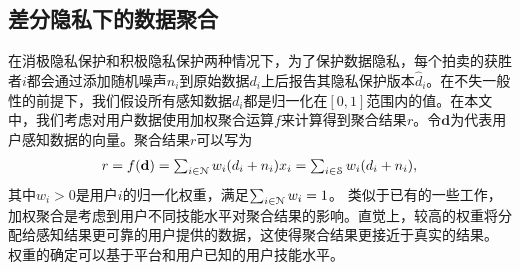 	\subsection{差分隐私下的数据聚合}\label{sec:dp}
	\vspace{-0.1cm}
	在消极隐私保护和积极隐私保护两种情况下，为了保护数据隐私，每个拍卖的获胜者$i$都会通过添加随机噪声$n_i$到原始数据$d_i$上后报告其隐私保护版本$\hat{d}_i$。在不失一般性的前提下，我们假设所有感知数据$d_i$都是归一化在$[0,1]$范围内的值。在本文中，我们考虑对用户数据使用加权聚合运算$f$来计算得到聚合结果$r$。令$\mathbf{d}$为代表用户感知数据的向量。聚合结果$r$可以写为
	\begin{equation}\label{f}
	\begin{array}
	[c]{lll}%
	r=f(\mathbf{d})=\sum_{i\in\mathcal{N}} w_i(d_i+n_i)x_i=\sum_{i\in\mathcal{S}} w_i(d_i+n_i),
	\end{array}
	\end{equation}
	其中$w_i>0$是用户$i$的归一化权重，满足$\sum_{i\in\mathcal{N}}w_i=1$。
	类似于已有的一些工作\cite{jin2016inception,li2014resolving,meng2015truth}，加权聚合是考虑到用户不同技能水平对聚合结果的影响。直觉上，较高的权重将分配给感知结果更可靠的用户提供的数据，这使得聚合结果更接近于真实的结果\cite{jin2016inception,li2014resolving,meng2015truth}。
	权重的确定可以基于平台和用户已知的用户技能水平\cite{jin2016inception}。
	
